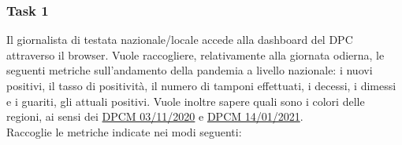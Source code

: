 \subsubsection{Task 1}
\label{sss:cw-task-1}
Il giornalista di testata nazionale/locale accede alla dashboard del DPC attraverso il browser.
Vuole raccogliere, relativamente alla giornata odierna, le seguenti metriche sull'andamento della pandemia a livello nazionale: i nuovi positivi, il tasso di positività, il numero di tamponi effettuati, i decessi, i dimessi e i guariti, gli attuali positivi.
Vuole inoltre sapere quali sono i colori delle regioni, ai sensi dei \href{https://www.gazzettaufficiale.it/eli/gu/2020/11/04/275/so/41/sg/pdf}{DPCM 03/11/2020} e \href{https://www.gazzettaufficiale.it/eli/id/2021/01/15/21A00221/sg}{DPCM 14/01/2021}.\\
Raccoglie le metriche indicate nei modi seguenti:
